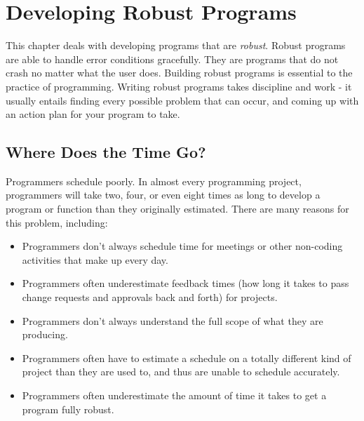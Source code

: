 \chapter{Developing Robust Programs}
\label{developingrobustprograms}


% 
% 
% 
% 

This chapter deals with developing programs that are 
\emph{robust}.  Robust
programs are able to handle error conditions gracefully.  They
are programs that do not crash no matter what the user does.  Building
robust programs is essential to the practice of programming.  Writing 
robust programs takes discipline and work - it usually entails finding every
possible problem that can occur, and coming up with an action plan for
your program to take.

\section{Where Does the Time Go?}

Programmers schedule poorly.  In almost every programming project, 
programmers will take two, four, or even eight times as long to develop
a program or function than they originally estimated.  There are many
reasons for this problem, including:

\begin{itemize}\item Programmers don't always schedule time for meetings or other non-coding activities that make up every day. 
\item Programmers often underestimate feedback times (how long it takes to pass change requests and approvals back and forth) for projects. 
\item Programmers don't always understand the full scope of what they are producing. 
\item Programmers often have to estimate a schedule on a totally different kind of project than they are used to, and thus are unable to schedule accurately. 
\item Programmers often underestimate the amount of time it takes to get a program fully robust. 
\end{itemize}

